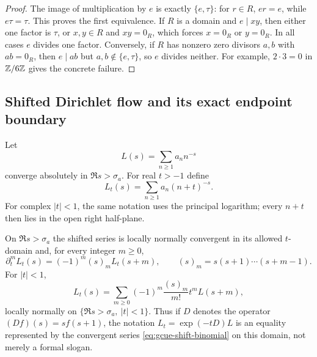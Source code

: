 \begin{proof}
The image of multiplication by $e$ is exactly $\{e,\tau\}$: for $r\in R$, $er=e$, while
$e\tau=\tau$.  This proves the first equivalence.  If $R$ is a domain and $e\mid xy$, then
either one factor is $\tau$, or $x,y\in R$ and $xy=0_R$, which forces $x=0_R$ or
$y=0_R$.  In all cases $e$ divides one factor.  Conversely, if $R$ has nonzero zero divisors
$a,b$ with $ab=0_R$, then $e\mid ab$ but $a,b\notin\{e,\tau\}$, so $e$ divides neither.
For example, $2\cdot3=0$ in $\mathbb{Z}/6\mathbb{Z}$ gives the concrete failure.
\end{proof}

\subsection{Shifted Dirichlet flow and its exact endpoint boundary}

Let
\[
 L(s)=\sum_{n\ge1}a_n n^{-s}
\]
converge absolutely in $\Re s>\sigma_a$.  For real $t>-1$ define
\[
 L_t(s)=\sum_{n\ge1}a_n(n+t)^{-s}.
\]
For complex $|t|<1$, the same notation uses the principal logarithm; every $n+t$ then lies
in the open right half-plane.

\begin{theorem}
\label{thm:gcue-shift-flow}
On $\Re s>\sigma_a$ the shifted series is locally normally convergent in its allowed
$t$-domain and, for every integer $m\ge0$,
\begin{equation}
 \partial_t^mL_t(s)=(-1)^m(s)_mL_t(s+m),
 \qquad
 (s)_m=s(s+1)\cdots(s+m-1).
 \label{eq:gcue-shift-jets}
\end{equation}
For $|t|<1$,
\begin{equation}
 L_t(s)=\sum_{m\ge0}(-1)^m\frac{(s)_m}{m!}t^mL(s+m),
 \label{eq:gcue-shift-binomial}
\end{equation}
locally normally on $\{\Re s>\sigma_a,\ |t|<1\}$.  Thus if
$D$ denotes the operator $(Df)(s)=s f(s+1)$, the notation
$L_t=\exp(-tD)L$ is an equality represented by the convergent series
\eqref{eq:gcue-shift-binomial} on this domain, not merely a formal slogan.
\end{theorem}

